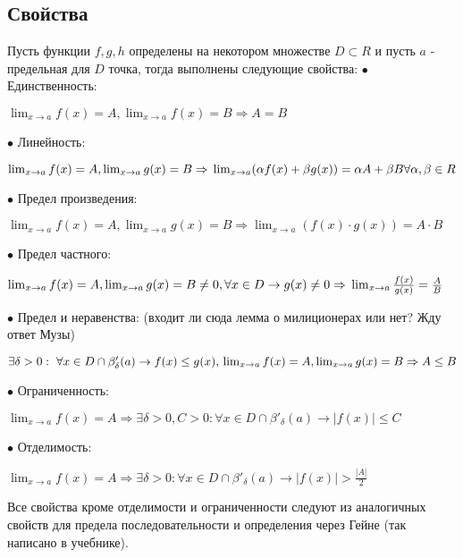 \documentclass[12pt]{article}
\theoremstyle{definition}
\begin{document}
\subsection{Свойства}
Пусть функции $f, g, h$ определены на некотором множестве $D \subset R$ и пусть $a$ - предельная для $D$ точка, тогда выполнены следующие свойства:\newline
$\bullet$ Единственность:
\begin{center}
$\lim_{x \to a} f(x) = A, \lim_{x \to a} f(x) = B \Rightarrow A  = B$
\end{center}
$\bullet$ Линейность:
\begin{center}
$\lim_{x \to a} f(x) = A, \lim_{x \to a} g(x) = B \Rightarrow \\\lim_{x \to a} (\alpha f(x) + \beta g(x) ) = \alpha A + \beta B \ \\ \forall \alpha, \beta \in R$
\end{center}
$\bullet$ Предел произведения:
\begin{center}
$\lim_{x \to a} f(x) = A, \lim_{x \to a} g(x) = B \Rightarrow \lim_{x \to a} (f(x) \cdot g(x)) = A \cdot B$
\end{center}
$\bullet$ Предел частного:
\begin{center}
$\lim_{x \to a} f(x) = A, \lim_{x \to a} g(x) = B \not = 0, \forall x \in D \to g(x) \not = 0 \Rightarrow \\
\lim_{x \to a} \frac{f(x)}{g(x)} = \frac{A}{B}$
\end{center}
$\bullet$ Предел и неравенства: (входит ли сюда лемма о милиционерах или нет? Жду ответ Музы)
\begin{center}
$\exists \delta  > 0: \  \forall x \in D \cap \beta'_{\delta}(a) \to  f(x) \leq g(x), \\ \lim_{x \to a} f(x) = A, \lim_{x \to a} g(x) = B \Rightarrow \\A \leq B$
\end{center}
$\bullet$ Ограниченность:
\begin{center}
$\lim_{x \to a} f(x) = A \Rightarrow \exists \delta > 0, C > 0: \forall x \in D \cap \beta'_{\delta}(a)  \to |f(x)| \leq C $
\end{center}
$\bullet$ Отделимость:
\begin{center}
$\lim_{x \to a} f(x) = A \Rightarrow \exists \delta > 0: \forall x \in D \cap \beta'_{\delta}(a)  \to |f(x)| > \frac{|A|}{2}$
\end{center}
Все свойства кроме отделимости и ограниченности следуют из аналогичных свойств для предела последовательности и определения через Гейне (так написано в учебнике).\newline
\end{document}
